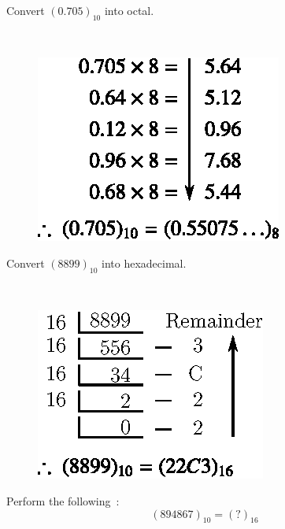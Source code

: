 \vfill\eject

\begin{problem}\label{prob5.12}
Convert $(0.705)_{10}$ into octal.
\end{problem}

\begin{solution}
~
\begin{figure}[H]
\centering
\includegraphics[scale=1.07]{chap5/div13.eps}
\end{figure}
\end{solution}

\begin{problem}\label{prob5.13}
Convert $(8899)_{10}$ into hexadecimal.
\end{problem}

\begin{solution}
~
\begin{figure}[H]
\centering
\includegraphics[scale=1.07]{chap5/div14.eps}
\end{figure}
\end{solution}

\begin{problem}\label{prob5.14}
Perform the following~:
$$
(894867)_{10}=(?)_{16}
$$
\end{problem}

